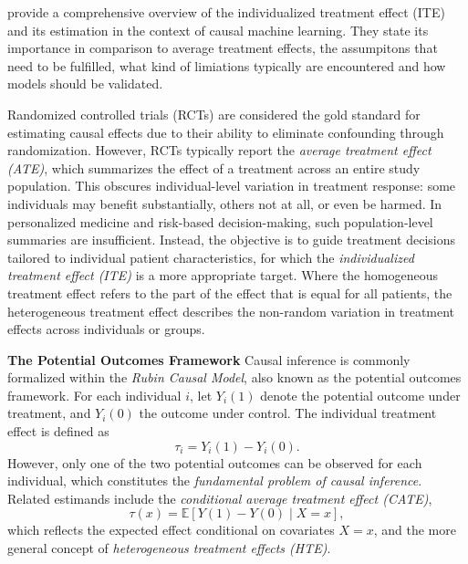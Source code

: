 

\citet{curth2024} provide a comprehensive overview of the individualized treatment effect (ITE) and its estimation in the context of causal machine learning. They state its importance in comparison to average treatment effects, the assumpitons that need to be fulfilled, what kind of limiations typically are encountered and how models should be validated.



Randomized controlled trials (RCTs) are considered the gold standard for estimating causal effects due to their ability to eliminate confounding through randomization. However, RCTs typically report the \textit{average treatment effect (ATE)}, which summarizes the effect of a treatment across an entire study population. This obscures individual-level variation in treatment response: some individuals may benefit substantially, others not at all, or even be harmed. In personalized medicine and risk-based decision-making, such population-level summaries are insufficient. Instead, the objective is to guide treatment decisions tailored to individual patient characteristics, for which the \textit{individualized treatment effect (ITE)} is a more appropriate target. Where the homogeneous treatment effect refers to the part of the effect that is equal for all patients, the heterogeneous treatment effect describes the non-random variation in treatment effects across individuals or groups. 

\textbf{The Potential Outcomes Framework } Causal inference is commonly formalized within the \textit{Rubin Causal Model}, also known as the potential outcomes framework. For each individual $i$, let $Y_i(1)$ denote the potential outcome under treatment, and $Y_i(0)$ the outcome under control. The individual treatment effect is defined as
\begin{equation}
\tau_i = Y_i(1) - Y_i(0).
\end{equation}
However, only one of the two potential outcomes can be observed for each individual, which constitutes the \textit{fundamental problem of causal inference}. Related estimands include the \textit{conditional average treatment effect (CATE)},
\begin{equation}
\tau(x) = \mathbb{E}[Y(1) - Y(0) \mid X = x],
\end{equation}
which reflects the expected effect conditional on covariates $X = x$, and the more general concept of \textit{heterogeneous treatment effects (HTE)}.

